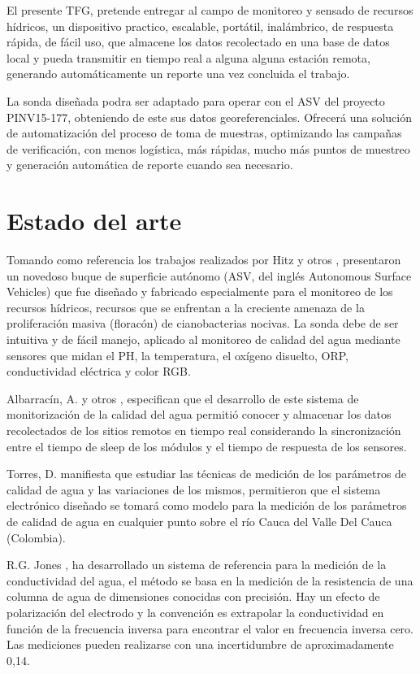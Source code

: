 El presente TFG, pretende entregar al campo de monitoreo y sensado de recursos hídricos, un dispositivo practico, escalable, portátil, inalámbrico, de respuesta rápida, de fácil uso, que almacene los datos recolectado en una base de datos local y pueda transmitir en tiempo real a alguna alguna estación remota, generando automáticamente un reporte una vez concluida el trabajo. 

La sonda diseñada podra ser adaptado para operar con el ASV del proyecto PINV15-177, obteniendo de este sus datos georeferenciales.
Ofrecer\'a una solución de automatizaci\'on del proceso de toma de muestras, optimizando  las campañas de verificaci\'on, con menos log\'istica, m\'as r\'apidas,  mucho m\'as puntos de muestreo y generaci\'on autom\'atica de reporte cuando sea necesario.


\section{Estado del arte}
Tomando como referencia los trabajos realizados por Hitz y otros \cite{hitz2012design}, presentaron un novedoso buque de superficie autónomo (ASV, del ingl\'es Autonomous Surface Vehicles) que fue dise\~nado y fabricado especialmente para el monitoreo de los recursos h\'idricos, recursos que se enfrentan a la creciente amenaza de la proliferaci\'on masiva (florac\'on) de cianobacterias nocivas. La sonda debe de ser intuitiva y de f\'acil manejo, aplicado al monitoreo de calidad del agua mediante sensores que midan el PH, la temperatura, el ox\'igeno disuelto,  ORP, conductividad el\'ectrica y color RGB. 

Albarrac\'in, A. y otros \cite{samaniegodevelopment}, especifican que el desarrollo de este sistema de monitorizaci\'on de la calidad del agua permiti\'o conocer y almacenar los datos recolectados de los sitios remotos en tiempo real considerando la sincronizaci\'on entre el tiempo de sleep de los m\'odulos y el tiempo de respuesta de los sensores. 

Torres, D. \cite{torres2009diseno} manifiesta que estudiar las t\'ecnicas de medici\'on de los par\'ametros de calidad de agua y las variaciones de los mismos, permitieron que el sistema electr\'onico dise\~nado se tomar\'a como modelo para la medici\'on de los par\'ametros de calidad de agua en cualquier punto sobre el río Cauca del Valle Del Cauca (Colombia).

R.G. Jones \cite{jones2002measurements}, ha desarrollado un sistema de referencia para la medici\'on de la conductividad del agua, el m\'etodo se basa en la medici\'on de la resistencia de una columna de agua de dimensiones conocidas con precisión. Hay un efecto de polarización del electrodo y la convención es extrapolar la conductividad en funci\'on de la frecuencia inversa para encontrar el valor en frecuencia inversa cero. Las mediciones pueden realizarse con una incertidumbre de aproximadamente 0,14.

